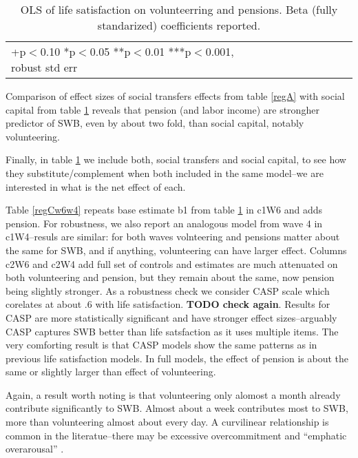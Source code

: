 \documentclass[10pt, letterpaper]{article}
\begin{document}
\begin{spacing}{1.4}
\begin{spacing}{.9}
\begin{table}[H]\centering \caption{OLS of life satisfaction on volunteerring
    and pensions. Beta (fully standarized) coefficients reported. }  \begin{scriptsize} \begin{tabular}{p{1.8in}p{.5in}p{.5in}p{.5in}p{.5in}p{.5in}p{.5in}p{.5in}p{.5in}p{.5in}p{.4in}p{.5in}p{.4in}}\hline 
      \hline\multicolumn{5}{l}{+p$<$0.10 *p$<$0.05 **p$<$0.01 ***p$<$0.001,
        robust std err} \end{tabular}\label{regB} \end{scriptsize}\end{table}
\end{spacing}


Comparison of effect sizes of social transfers effects from table \ref{regA} with  
 social capital from table \ref{regB} reveals that pension (and labor income) are
 strongher  predictor of SWB, even by about two fold,  than social capital, notably volunteering.

Finally, in table \ref{regB} we include both, social transfers and social
capital,  to see how they substitute/complement
when both included in the same model--we are interested in what is the net
effect of each.

Table \ref{regCw6w4} repeats base estimate b1 from table \ref{regB} in c1W6 and
adds pension. For
robustness, we also report an analogous model from wave 4 in c1W4--resuls are
similar: for both waves volnteering and pensions matter about the same for SWB,
 and if anything, volunteering can have larger effect.
% 
Columns c2W6 and c2W4 add full set of controls and estimates are much attenuated
on both volunteering and pension, but they remain about the same, now pension
being slightly stronger.
%
As a robustness check we consider CASP scale which corelates at about .6 with
 life satisfaction. \textbf{TODO check again}. Results for CASP are more statistically
significant and have stronger effect sizes--arguably CASP captures SWB better
than life satsfaction as it uses multiple items. The very comforting result is
that CASP models show the same patterns as in previous life satisfaction
models. In full models, the effect of pension is about the same or  slightly larger than effect of volunteering.

Again, a result worth noting is that volunteering only alomost a month already
contribute significantly to SWB. Almost about a week contributes most
to SWB, more than volunteering almost about every day. A curvilinear
relationship is common in the literatue--there may be excessive overcommitment
and ``emphatic overarousal''  \citep{wilson12B}.%


\end{spacing}
\end{document}
